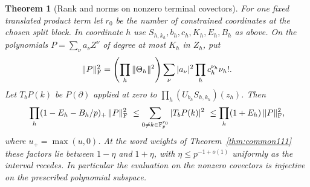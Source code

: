 \documentclass[a4paper,11pt]{article}
\newtheorem{theorem}[proposition]{Theorem}
\theoremstyle{definition}
\theoremstyle{remark}
\numberwithin{equation}{section}
\begin{document}
\begin{theorem}[Rank and norms on nonzero terminal covectors]\leavevmode
\label{thm:puncturedisometry518}
For one fixed translated product term let \(r_0\) be the number of
constrained coordinates at the chosen split block. In coordinate
\(h\) use \(S_{h,k_h}, b_h,c_h,K_h,E_h,B_h\) as above. On the
polynomials \(P=\sum_\nu a_\nu Z^\nu\) of degree at most \(K_h\)
in \(Z_h\), put
\[
 \|P\|_{\rm F}^2=\left(\prod_h\|\Theta_h\|^2\right)
      \sum_\nu |a_\nu|^2\prod_h c_h^{\nu_h}\nu_h! .
\]
Let \(T_bP(k)\) be \(P(\partial)\) applied at zero to
\(\prod_h(U_{b_h}S_{h,k_h})(z_h)\). Then
\[
 \prod_h(1-E_h-B_h/p)_+\,\|P\|_{\rm F}^2
 \ \le\sum_{0\ne k\in\mathbb F_p^{r_0}} |T_bP(k)|^2
 \ \le\prod_h(1+E_h)\,\|P\|_{\rm F}^2,
\]
where \(u_+=\max(u,0)\). At the word weights of
Theorem~\ref{thm:common111} these factors lie between \(1-\eta\)
and \(1+\eta\), with \(\eta\le p^{-1+o(1)}\) uniformly as the
interval recedes. In particular the evaluation on the nonzero
covectors is injective on the prescribed polynomial subspace.
\end{theorem}
\end{document}
